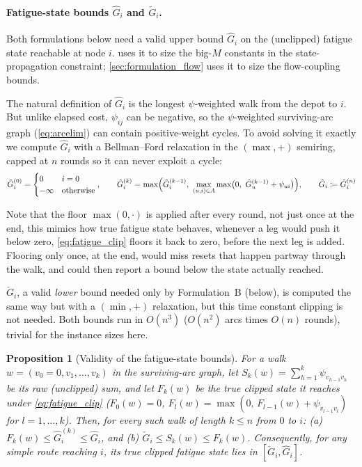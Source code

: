 \documentclass[11pt,a4paper]{article}
\newtheorem{proposition}{Proposition}
\begin{document}
\paragraph{Fatigue-state bounds $\hat{G}_i$ and $\check{G}_i$.}
Both formulations below need a valid upper bound $\hat{G}_i$ on the (unclipped) fatigue state reachable at node $i$.
 uses it to size the big-$M$ constants in the state-propagation constraint; \cref{sec:formulation_flow} uses it to size the flow-coupling bounds.

The natural definition of $\hat{G}_i$ is the longest $\psi$-weighted walk from the depot to $i$.
But unlike elapsed cost, $\psi_{ij}$ can be negative, so the $\psi$-weighted surviving-arc graph (\cref{eq:arcelim}) can contain positive-weight cycles.
To avoid solving it exactly we compute $\hat{G}_i$ with a Bellman--Ford relaxation in the $(\max,+)$ semiring, capped at $n$ rounds so it can never exploit a cycle:
\begin{equation}
  \hat{G}_i^{(0)} = \begin{cases} 0 & i = 0 \\ -\infty & \text{otherwise} \end{cases}, \qquad
  \hat{G}_i^{(k)} = \max\Bigl(\hat{G}_i^{(k-1)},\ \max_{(u,i) \in A} \max\bigl(0,\ \hat{G}_u^{(k-1)} + \psi_{ui}\bigr)\Bigr), \qquad
  \hat{G}_i \coloneqq \hat{G}_i^{(n)}
  \label{eq:ghat}
\end{equation}

Note that the floor $\max(0,\cdot)$ is applied after every round, not just once at the end, this mimics how true fatigue state behaves, whenever a leg would push it below zero, \cref{eq:fatigue_clip} floors it back to zero, before the next leg is added.
Flooring only once, at the end, would miss resets that happen partway through the walk, and could then report a bound below the state actually reached.

$\check{G}_i$, a valid \emph{lower} bound needed only by Formulation~B (below), is computed the same way but with a $(\min,+)$ relaxation, but this time constant clipping is not needed. Both bounds run in $O(n^3)$ ($O(n^2)$ arcs times $O(n)$ rounds), trivial for the instance sizes here.

\begin{proposition}[Validity of the fatigue-state bounds]
\label{prop:ghat}
For a walk $w = (v_0{=}0, v_1, \ldots, v_k)$ in the surviving-arc graph, let $S_k(w) = \sum_{h=1}^{k} \psi_{v_{h-1}v_h}$ be its raw (unclipped) sum, and let $F_k(w)$ be the true clipped state it reaches under \cref{eq:fatigue_clip} ($F_0(w)=0$, $F_l(w) = \max(0,\, F_{l-1}(w) + \psi_{v_{l-1}v_l})$ for $l=1,\ldots,k$).
Then, for every such walk of length $k \leq n$ from $0$ to $i$:
\textup{(a)} $F_k(w) \leq \hat{G}_i^{(k)} \leq \hat{G}_i$, and
\textup{(b)} $\check{G}_i \leq S_k(w) \leq F_k(w)$.
Consequently, for any simple route reaching $i$, its true clipped fatigue state lies in $[\check{G}_i, \hat{G}_i]$.
\end{proposition}
\end{document}
